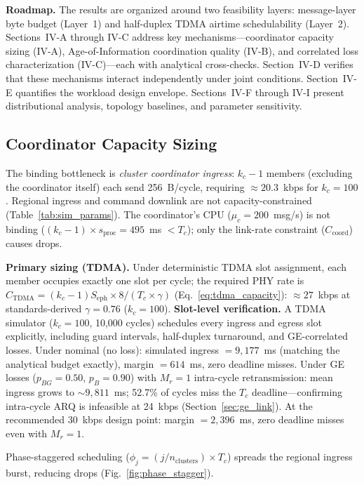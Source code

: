 \documentclass[journal]{IEEEtran}
\begin{document}
\textbf{Roadmap.} The results are organized around two feasibility layers: message-layer byte budget (Layer~1) and half-duplex TDMA airtime schedulability (Layer~2). Sections~IV-A through IV-C address key mechanisms---coordinator capacity sizing (IV-A), Age-of-Information coordination quality (IV-B), and correlated loss characterization (IV-C)---each with analytical cross-checks. Section~IV-D verifies that these mechanisms interact independently under joint conditions. Section~IV-E quantifies the workload design envelope. Sections~IV-F through IV-I present distributional analysis, topology baselines, and parameter sensitivity.

\subsection{Coordinator Capacity Sizing}
\label{sec:coordinator_bandwidth}

The binding bottleneck is \emph{cluster coordinator ingress}: $k_c - 1$ members (excluding the coordinator itself) each send 256~B/cycle, requiring ${\approx}20.3$~kbps for $k_c = 100$. Regional ingress and command downlink are not capacity-constrained (Table~\ref{tab:sim_params}). The coordinator's CPU ($\mu_c = 200$~msg/s) is not binding ($(k_c - 1) \times s_{\text{proc}} = 495$~ms $< T_c$); only the link-rate constraint ($C_{\text{coord}}$) causes drops.

\textbf{Primary sizing (TDMA).} Under deterministic TDMA slot assignment, each member occupies exactly one slot per cycle; the required PHY rate is $C_{\text{TDMA}} = (k_c - 1) S_{\text{eph}} \times 8 / (T_c \times \gamma)$ (Eq.~\ref{eq:tdma_capacity}): ${\approx}27$~kbps at standards-derived $\gamma = 0.76$ ($k_c = 100$). \textbf{Slot-level verification.} A TDMA simulator ($k_c = 100$, 10{,}000 cycles) schedules every ingress and egress slot explicitly, including guard intervals, half-duplex turnaround, and GE-correlated losses. Under nominal (no loss): simulated ingress $= 9{,}177$~ms (matching the analytical budget exactly), margin $= 614$~ms, zero deadline misses. Under GE losses ($p_{BG} = 0.50$, $p_B = 0.90$) with $M_r = 1$ intra-cycle retransmission: mean ingress grows to ${\sim}9{,}811$~ms; 52.7\% of cycles miss the $T_c$ deadline---confirming intra-cycle ARQ is infeasible at 24~kbps (Section~\ref{sec:ge_link}). At the recommended 30~kbps design point: margin $= 2{,}396$~ms, zero deadline misses even with $M_r = 1$.

Phase-staggered scheduling ($\phi_j = (j / n_{\text{clusters}}) \times T_c$) spreads the regional ingress burst, reducing drops (Fig.~\ref{fig:phase_stagger}).
\end{document}
